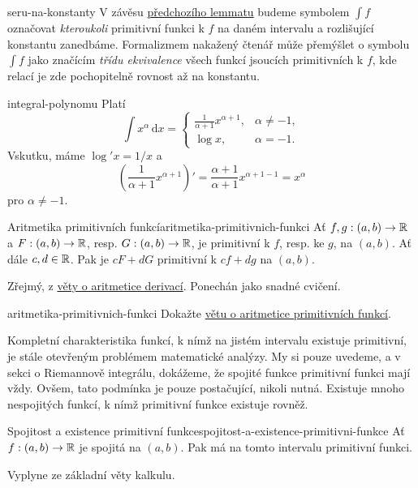 \begin{remark}{}{seru-na-konstanty}
 V závěsu \hyperref[lem:jednoznacnost-primitivni-funkce]{předchozího lemmatu}
 budeme symbolem $\int f$ označovat \emph{kteroukoli} primitivní funkci k $f$ na
 daném intervalu a rozlišující konstantu zanedbáme. Formalizmem nakažený čtenář
 může přemýšlet o symbolu $\int f$ jako značícím \emph{třídu ekvivalence} všech
 funkcí jsoucích primitivních k $f$, kde relací je zde pochopitelně rovnost až
 na konstantu.
\end{remark}

\begin{example}{}{integral-polynomu}
 Platí
 \[
  \int x^{\alpha} \, \mathrm{d}x = 
  \begin{cases}
   \frac{1}{\alpha+1}x^{\alpha+1},& \alpha \neq -1,\\
   \log x,& \alpha = -1.
  \end{cases}
 \]
 Vskutku, máme $\log'x = 1 / x$ a
 \[
  \left( \frac{1}{\alpha+1}x^{\alpha+1} \right)' =
  \frac{\alpha+1}{\alpha+1}x^{\alpha+1-1} = x^{\alpha}
 \]
 pro $\alpha \neq -1$.
\end{example}

\begin{theorem}{Aritmetika primitivních funkcí}{aritmetika-primitivnich-funkci}
 Ať $f,g:(a,b) \to \mathbb{R}$ a $F:(a,b) \to \mathbb{R}$, resp. $G:(a,b) \to \mathbb{R}$, je primitivní
 k $f$, resp. ke $g$, na $(a,b)$. Ať dále $c,d \in \mathbb{R}$. Pak je $cF + dG$
 primitivní k $cf + dg$ na $(a,b)$.
\end{theorem}
\begin{thmproof}
 Zřejmý, z \hyperref[thm:aritmetika-derivaci]{věty o aritmetice derivací}.
 Ponechán jako snadné cvičení.
\end{thmproof}
\begin{exercise}{}{aritmetika-primitivnich-funkci}
 Dokažte \hyperref[thm:aritmetika-primitivnich-funkci]{větu o aritmetice
 primitivních funkcí}.
\end{exercise}

Kompletní charakteristika funkcí, k nímž na jistém intervalu existuje
primitivní, je stále otevřeným problémem matematické analýzy. My si pouze
uvedeme, a v sekci o Riemannově integrálu, dokážeme, že spojité funkce
primitivní funkci mají vždy. Ovšem, tato podmínka je pouze postačující, nikoli
nutná. Existuje mnoho nespojitých funkcí, k nímž primitivní funkce existuje
rovněž.

\begin{theorem}{Spojitost a existence primitivní funkce}{spojitost-a-existence-primitivni-funkce}
 Ať $f:(a,b) \to \mathbb{R}$ je spojitá na $(a,b)$. Pak má na tomto intervalu primitivní
 funkci.
\end{theorem}
\begin{thmproof}
 Vyplyne ze základní věty kalkulu.
\end{thmproof}

